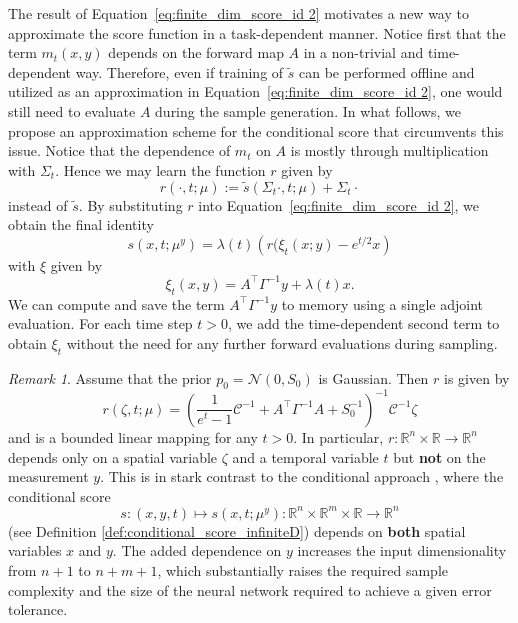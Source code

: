 \documentclass[10pt]{article} %
\def\Eqref#1{Equation~\ref{#1}}
\newcommand{\R}{\mathbb{R}}
\theoremstyle{plain}
\theoremstyle{definition}
\theoremstyle{remark}
\newtheorem{remark}[theorem]{Remark}
\newcommand{\C}{\mathcal C}
\newcommand{\N}{\mathcal N}
\newcommand{\fabian}[1]{{#1}}%
\newcommand{\lam}[1]{{ #1}}
\begin{document}
The result of \Eqref{eq:finite_dim_score_id 2} motivates a new way to approximate the score function in a task-dependent manner. Notice first that the term $m_t(x,y)$ depends on the forward map $A$ in a non-trivial and time-dependent way. Therefore, even if training of $\tilde s$ can be performed offline and utilized as an approximation in \Eqref{eq:finite_dim_score_id 2}, one would still need to evaluate $A$ during the sample generation. In what follows, we propose an approximation scheme for the conditional score that circumvents this issue.
Notice that the dependence of $m_t$ on $A$ is mostly through multiplication with $\Sigma_t$. Hence we may learn the function $r$ given by
\begin{equation*}
    r(\cdot, t; \mu) := \tilde{s}(\Sigma_t \cdot, t; \mu) + \Sigma_t \cdot
\end{equation*}
instead of $\tilde s$. By substituting $r$ into \Eqref{eq:finite_dim_score_id 2}, we obtain the final identity
\begin{equation*}\label{eq:finite_dim_score_id 3}
    s(x, t; \mu^y) = \lambda(t) \left(  r(\xi_t(x;y)- e^{t/2}x \right)
\end{equation*}
with $\xi$ given by
\begin{equation*}	
	\xi_t(x,y) =  A^\top \Gamma^{-1} y + \lambda(t)x.
\end{equation*}
We can compute and save the term $ A^\top \Gamma^{-1} y$ to memory using a single adjoint evaluation. For each time step $t>0$, we add the time-dependent second term to obtain $\xi_t$ without the need for any further forward evaluations during sampling. 

\begin{remark}
    Assume that the prior $p_0 = \N(0, S_0)$ is Gaussian. Then $r$ is given by
    \begin{equation*}
        r (\zeta, t; \mu) =  \left(\frac{1}{e^t-1}\C^{-1} + A^\top \Gamma^{-1}A + S_0^{-1} \right)^{-1} \C^{-1}\zeta
    \end{equation*}
and is a bounded linear mapping for any $t>0$. In particular, $r :\R^n \times \R \to \R^n$ depends only on a spatial variable $\zeta$ and a temporal variable $t$ but \textbf{not} on the measurement $y$. \fabian{This is in stark contrast to the conditional approach \cite{baldassari2024conditional}, where the conditional score 
\lam{$$s: (x,y,t) \mapsto s(x,t; \mu^y) : \R^n \times \R^m \times \R \to \R^n$$ 
(see Definition \ref{def:conditional_score_infiniteD}) depends on \textbf{both} spatial variables $x$ and $y$. The added dependence on $y$ increases the input dimensionality from $n+1$ to $n+m+1$, which substantially raises the required sample complexity and the size of the neural network required to achieve a given error tolerance.}}
\end{remark}
\end{document}
